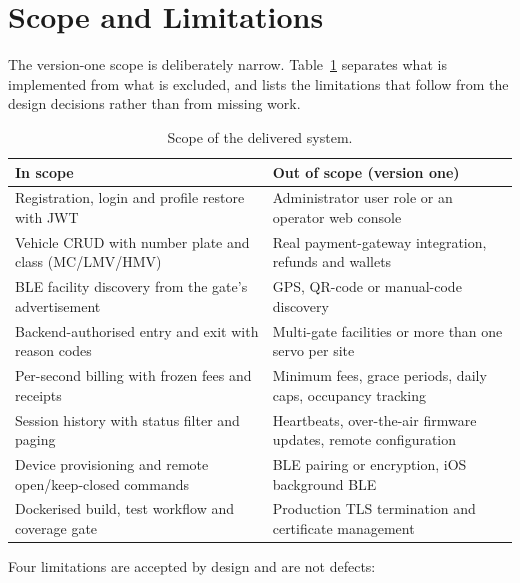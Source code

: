 \section{Scope and Limitations}

The version-one scope is deliberately narrow. Table~\ref{tab:scope} separates what
is implemented from what is excluded, and lists the limitations that follow from
the design decisions rather than from missing work.

\begin{table}[htbp]
  \centering
  \small
  \begin{tabularx}{\textwidth}{@{}lX@{}}
    \toprule
    \textbf{In scope} & \textbf{Out of scope (version one)} \\
    \midrule
    Registration, login and profile restore with JWT &
      Administrator user role or an operator web console \\
    Vehicle CRUD with number plate and class (MC/LMV/HMV) &
      Real payment-gateway integration, refunds and wallets \\
    BLE facility discovery from the gate's advertisement &
      GPS, QR-code or manual-code discovery \\
    Backend-authorised entry and exit with reason codes &
      Multi-gate facilities or more than one servo per site \\
    Per-second billing with frozen fees and receipts &
      Minimum fees, grace periods, daily caps, occupancy tracking \\
    Session history with status filter and paging &
      Heartbeats, over-the-air firmware updates, remote configuration \\
    Device provisioning and remote open/keep-closed commands &
      BLE pairing or encryption, iOS background BLE \\
    Dockerised build, test workflow and coverage gate &
      Production TLS termination and certificate management \\
    \bottomrule
  \end{tabularx}
  \caption{Scope of the delivered system.}
  \label{tab:scope}
\end{table}

Four limitations are accepted by design and are not defects:

